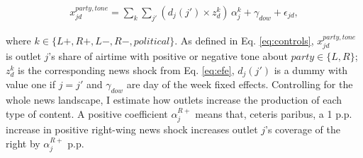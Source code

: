 \documentclass[12pt]{article}
\begin{document}

\begin{equation}\label{eq:first_stage}
	\begin{aligned}
		 x^{party, tone}_{jd} =	\sum_{k} \sum_{j'}
		\left(d_j(j') \times z^{k}_d\right)\,\alpha_{j}^{k}
		+ \gamma_{dow}+\epsilon_{jd},
	\end{aligned}
\end{equation}

where $k \in\{L+,R+,L-,R-, political\}$. As defined in Eq. \eqref{eq:controls},  $x^{party, tone}_{jd}$ is outlet $j$’s share of airtime with positive or negative tone about $party \in \{L,R\}$;  $z^{k}_d$ is the corresponding news shock from Eq. \eqref{eq:efe}, $d_j(j')$ is a dummy with value one if $j=j'$ and $\gamma_{dow}$ are day of the week fixed effects.  Controlling for the whole news landscape, I estimate how outlets increase the production of each type of content.
A positive coefficient $\alpha_{j}^{R+}$ means that, ceteris paribus, a 1 p.p. increase in  positive right-wing news shock increases outlet $j$’s coverage of the right by $\alpha_{j}^{R+}$ p.p.
\end{document}
